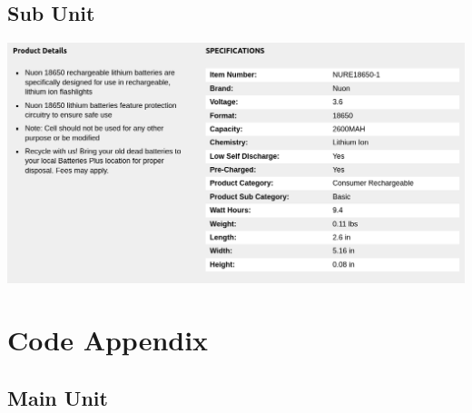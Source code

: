 \documentclass[12pt]{article}
\newenvironment{code}{\captionsetup{type=listing}}{}
\begin{document}
\subsection{Sub Unit}
\includegraphics[width=\textwidth]{../Appendix/Figures/Sub-Unit/ 5-May-2023-13-05.png}












\section{Code Appendix}
\subsection{Main Unit}
\begin{code}
  \label{code:main-unit-main.c}
    \inputminted[breaklines,breakanywhere]{C}{../../Main-unit/main.c}
\end{code}
\end{document}

